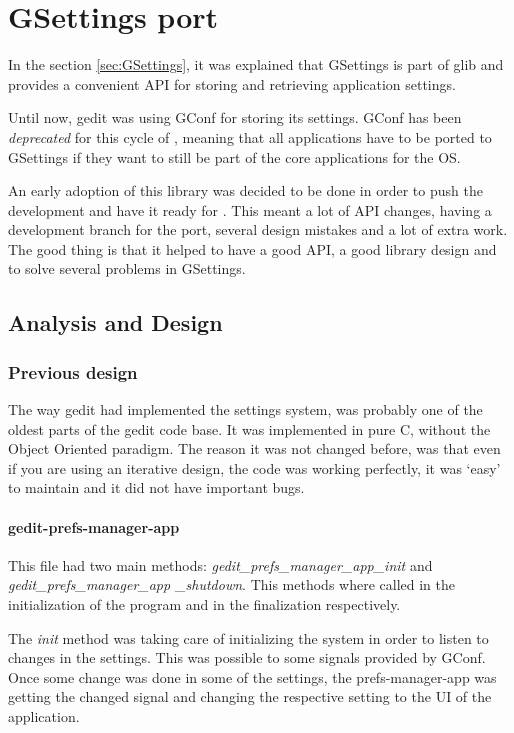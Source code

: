 
\chapter{GSettings port}

In the section \ref{sec:GSettings}, it was explained that GSettings is part of glib and provides a convenient API for storing and retrieving application settings.

Until now, gedit was using GConf for storing its settings. GConf has been \emph{deprecated} for this cycle of \GNOME, meaning that all \GNOME applications have to be ported to GSettings if they want to still be part of the core applications for the \GNOME OS.

An early adoption of this library was decided to be done in order to push the development and have it ready for . This meant a lot of API changes, having a development branch for the port, several design mistakes and a lot of extra work. The good thing is that it helped to have a good API, a good library design and to solve several problems in GSettings.

\section{Analysis and Design}

\subsection{Previous design}

The way gedit had implemented the settings system, was probably one of the oldest parts of the gedit code base. It was implemented in pure C, without the Object Oriented paradigm. The reason it was not changed before, was that even if you are using an iterative design, the code was working perfectly, it was `easy' to maintain and it did not have important bugs.

\newpage
\subsubsection*{gedit-prefs-manager-app}

This file had two main methods: \textit{gedit\_prefs\_manager\_app\_init} and \textit{gedit\_prefs\_manager\_app \_shutdown}. This methods where called in the initialization of the program and in the finalization respectively.

The \emph{init} method was taking care of initializing the system in order to listen to changes in the settings. This was possible to some signals provided by GConf. Once some change was done in some of the settings, the prefs-manager-app was getting the changed signal and changing the respective setting to the UI of the application.

